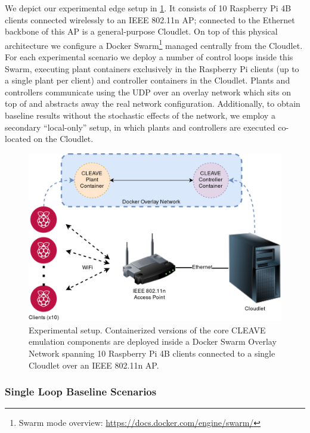 We depict our experimental edge setup in \cref{fig:cleave:expsetup}.
It consists of \num{10} Raspberry Pi 4B  clients connected wirelessly to an IEEE 802.11n \ac{AP}; connected to the Ethernet backbone of this \ac{AP} is a general-purpose Cloudlet.
On top of this physical architecture we configure a Docker Swarm\footnote{Swarm mode overview: \url{https://docs.docker.com/engine/swarm/}} managed centrally from the Cloudlet.
For each experimental scenario we deploy a number of control loops inside this Swarm, executing plant containers exclusively in the Raspberry Pi clients (up to a single plant per client) and controller containers in the Cloudlet.
Plants and controllers communicate using the \ac{UDP} over an overlay network which sits on top of and abstracts away the real network configuration.
Additionally, to obtain baseline results without the stochastic effects of the network, we employ a secondary ``local-only'' setup, in which plants and controllers are executed co-located on the Cloudlet.

\begin{figure}
    \centering
    \includegraphics[width=.95\columnwidth]{images/CLEAVE_experiment_setup}
    \caption{Experimental setup. Containerized versions of the core CLEAVE emulation components are deployed inside a Docker Swarm Overlay Network spanning \num{10} Raspberry Pi 4B clients connected to a single Cloudlet over an IEEE 802.11n \ac{AP}.}\label{fig:cleave:expsetup}
\end{figure}

\subsubsection{Single Loop Baseline Scenarios}

